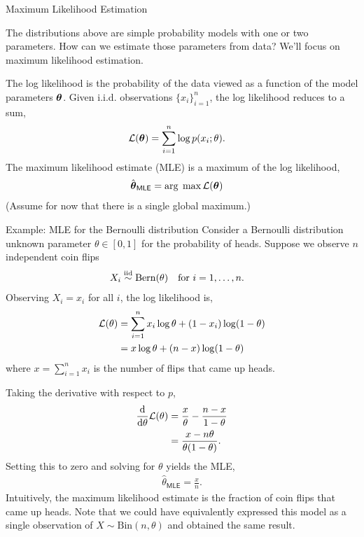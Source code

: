 \documentclass[aspectratio=169]{beamer}
\begin{document}
\begin{frame}[t,allowframebreaks]{Maximum Likelihood
Estimation}\label{maximum-likelihood-estimation}

The distributions above are simple probability models with one or two
parameters. How can we estimate those parameters from data? We'll focus
on maximum likelihood estimation.

The log likelihood is the probability of the data viewed as a function
of the model parameters \(\boldsymbol{\theta}\). Given i.i.d. observations
\(\{x_i\}_{i=1}^n\), the log likelihood reduces to a sum, \begin{align*}
\mathcal{L}(\boldsymbol{\theta}) &= \sum_{i=1}^n \log p(x_i; \theta).
\end{align*} The maximum likelihood estimate (MLE) is a maximum of the
log likelihood, \begin{align*}
\hat{\boldsymbol{\theta}}_{\mathsf{MLE}} &= \arg\; \max \mathcal{L}(\boldsymbol{\theta})
\end{align*} (Assume for now that there is a single global maximum.)
\end{frame}

\begin{frame}[t,allowframebreaks]{Example: MLE for the Bernoulli distribution} 
Consider a Bernoulli distribution unknown parameter
\(\theta \in [0,1]\) for the probability of heads. Suppose we observe
\(n\) independent coin flips \begin{align*}
X_i &\stackrel{\text{iid}}{\sim} \mathrm{Bern}(\theta) & \text{for } i&=1,\ldots, n.
\end{align*} Observing \(X_i=x_i\) for all \(i\), the log likelihood is,
\begin{align*}
\mathcal{L}(\theta) 
&= \sum_{i=1}^n x_i \log \theta + (1 - x_i) \log (1 - \theta) \\
&= x \log \theta + (n - x) \log (1 - \theta)
\end{align*} where \(x = \sum_{i=1}^n x_i\) is the number of flips that
came up heads.

Taking the derivative with respect to \(p\), \begin{align*}
\frac{\mathop{}\!\mathrm{d}}{\mathop{}\!\mathrm{d} \theta} \mathcal{L}(\theta) 
&= \frac{x}{\theta} - \frac{n - x}{1 - \theta} \\
&= \frac{x - n\theta}{\theta (1 - \theta)}.
\end{align*} Setting this to zero and solving for \(\theta\) yields the
MLE, \begin{align*}
\hat{\theta}_{\mathsf{MLE}} = \frac{x}{n}.
\end{align*} Intuitively, the maximum likelihood estimate is the
fraction of coin flips that came up heads. Note that we could have
equivalently expressed this model as a single observation of
\(X \sim \mathrm{Bin}(n, \theta)\) and obtained the same result.

\end{frame}
\end{document}
